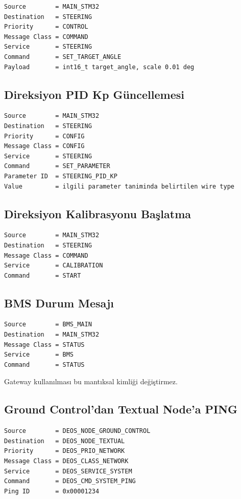 \documentclass[a4paper,10pt]{article}
\begin{document}
\begin{verbatim}
Source        = MAIN_STM32
Destination   = STEERING
Priority      = CONTROL
Message Class = COMMAND
Service       = STEERING
Command       = SET_TARGET_ANGLE
Payload       = int16_t target_angle, scale 0.01 deg
\end{verbatim}

\subsection{Direksiyon PID Kp Güncellemesi}

\begin{verbatim}
Source        = MAIN_STM32
Destination   = STEERING
Priority      = CONFIG
Message Class = CONFIG
Service       = STEERING
Command       = SET_PARAMETER
Parameter ID  = STEERING_PID_KP
Value         = ilgili parameter taniminda belirtilen wire type
\end{verbatim}

\subsection{Direksiyon Kalibrasyonu Başlatma}

\begin{verbatim}
Source        = MAIN_STM32
Destination   = STEERING
Message Class = COMMAND
Service       = CALIBRATION
Command       = START
\end{verbatim}

\subsection{BMS Durum Mesajı}

\begin{verbatim}
Source        = BMS_MAIN
Destination   = MAIN_STM32
Message Class = STATUS
Service       = BMS
Command       = STATUS
\end{verbatim}

Gateway kullanılması bu mantıksal kimliği değiştirmez.


\subsection{Ground Control'dan Textual Node'a PING}

\begin{verbatim}
Source        = DEOS_NODE_GROUND_CONTROL
Destination   = DEOS_NODE_TEXTUAL
Priority      = DEOS_PRIO_NETWORK
Message Class = DEOS_CLASS_NETWORK
Service       = DEOS_SERVICE_SYSTEM
Command       = DEOS_CMD_SYSTEM_PING
Ping ID       = 0x00001234
\end{verbatim}
\end{document}
